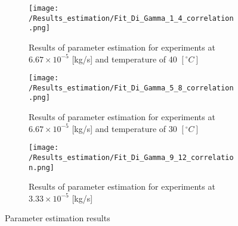 \documentclass[../Supercritical_fluid_extraction_of_essential_oil_from_chamomile.tex]{subfiles}
\begin{document}
	\begin{figure*}[!h]
		\centering
		\begin{subfigure}{0.3\textwidth}
			\centering
			\texttt{[image: /Results\_estimation/Fit\_Di\_Gamma\_1\_4\_correlation.png]}
			\caption{Results of parameter estimation for experiments at $6.67\times 10^{-5}$ [kg/s] and temperature of 40 $[^\circ C]$}
			\label{fig: Fit_1_4_Di_Gamma_correlation}
		\end{subfigure}
		\hfill
		\begin{subfigure}{0.3\textwidth}
			\centering
			\texttt{[image: /Results\_estimation/Fit\_Di\_Gamma\_5\_8\_correlation.png]}
			\caption{Results of parameter estimation for experiments at $6.67\times 10^{-5}$ [kg/s] and temperature of 30 $[^\circ C]$}
			\label{fig: Fit_5_8_Di_Gamma_correlation}
		\end{subfigure}
		\hfill
		\begin{subfigure}{0.3\textwidth}
			\centering
			\texttt{[image: /Results\_estimation/Fit\_Di\_Gamma\_9\_12\_correlation.png]}
			\caption{Results of parameter estimation for experiments at $3.33\times 10^{-5}$ [kg/s]}
			\label{fig: Fit_9_12_Di_Gamma_correlation}
		\end{subfigure}
		\caption{Parameter estimation results}
		\label{fig: Fit_Di_Gamma_correlation}
	\end{figure*}	
	
\end{document}
